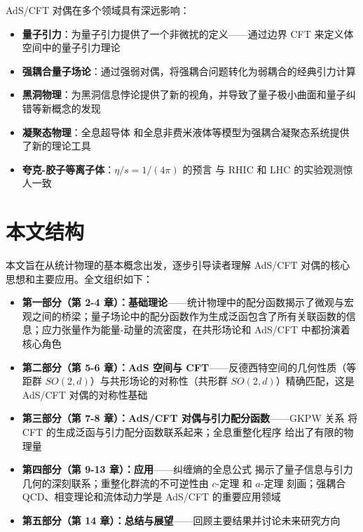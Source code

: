 \documentclass[lang=cn,10pt,chinese]{elegantbook}
\begin{document}
AdS/CFT 对偶在多个领域具有深远影响：
\begin{itemize}
    \item \textbf{量子引力}：为量子引力提供了一个非微扰的定义——通过边界 CFT 来定义体空间中的量子引力理论
    \item \textbf{强耦合量子场论}：通过强弱对偶，将强耦合问题转化为弱耦合的经典引力计算
    \item \textbf{黑洞物理}：为黑洞信息悖论提供了新的视角，并导致了量子极小曲面和量子纠错等新概念的发现
    \item \textbf{凝聚态物理}：全息超导体 \cite{Hartnoll2008} 和全息非费米液体等模型为强耦合凝聚态系统提供了新的理论工具
    \item \textbf{夸克-胶子等离子体}：$\eta/s = 1/(4\pi)$ 的预言 \cite{Kovtun2005} 与 RHIC 和 LHC 的实验观测惊人一致
\end{itemize}

\section{本文结构}
本文旨在从统计物理的基本概念出发，逐步引导读者理解 AdS/CFT 对偶的核心思想和主要应用。全文组织如下：
\begin{itemize}
    \item \textbf{第一部分（第 2-4 章）：基础理论}——统计物理中的配分函数揭示了微观与宏观之间的桥梁；量子场论中的配分函数作为生成泛函包含了所有关联函数的信息；应力张量作为能量-动量的流密度，在共形场论和 AdS/CFT 中都扮演着核心角色
    \item \textbf{第二部分（第 5-6 章）：AdS 空间与 CFT}——反德西特空间的几何性质（等距群 $SO(2,d)$）与共形场论的对称性（共形群 $SO(2,d)$）精确匹配，这是 AdS/CFT 对偶的对称性基础
    \item \textbf{第三部分（第 7-8 章）：AdS/CFT 对偶与引力配分函数}——GKPW 关系 \cite{Gubser1998, Witten1998} 将 CFT 的生成泛函与引力配分函数联系起来；全息重整化程序 \cite{Henningson1998, Balasubramanian1999} 给出了有限的物理量
    \item \textbf{第四部分（第 9-13 章）：应用}——纠缠熵的全息公式 \cite{Ryu2006} 揭示了量子信息与引力几何的深刻联系；重整化群流的不可逆性由 $c$-定理 \cite{Zamolodchikov1986} 和 $a$-定理 \cite{Komargodski2011} 刻画；强耦合 QCD、相变理论和流体动力学是 AdS/CFT 的重要应用领域
    \item \textbf{第五部分（第 14 章）：总结与展望}——回顾主要结果并讨论未来研究方向
\end{itemize}

\end{document}
